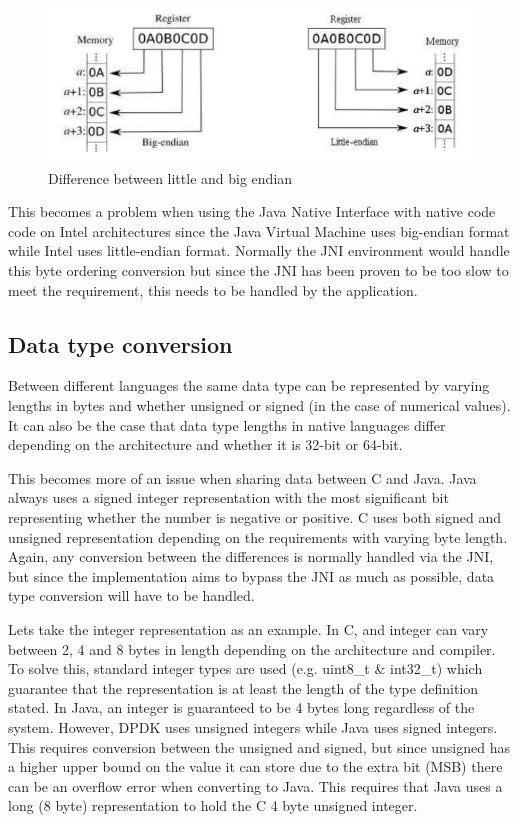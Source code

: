 \documentclass[final_report.tex]{subfiles}
\begin{document}
\begin{figure}[H]
	\centering
	\includegraphics[width=\textwidth]{img/endian.png}
	\caption{Difference between little and big endian}
	\label{fig:endian}
\end{figure}

This becomes a problem when using the Java Native Interface with native code code on Intel architectures since the Java Virtual Machine uses big-endian format while Intel uses little-endian format. Normally the JNI environment would handle this byte ordering conversion but since the JNI has been proven to be too slow  to meet the requirement, this needs to be handled by the application.

\subsection{Data type conversion}
Between different languages the same data type can be represented by varying lengths in bytes and whether unsigned or signed (in the case of numerical values). It can also be the case that data type lengths in native languages differ depending on the architecture and whether it is 32-bit or 64-bit.

This becomes more of an issue when sharing data between C and Java. Java always uses a signed integer representation with the most significant bit representing whether the number is negative or positive. C uses both signed and unsigned representation depending on the requirements with varying byte length. Again, any conversion between the differences is normally handled via the JNI, but since the implementation aims to bypass the JNI as much as possible, data type conversion will have to be handled.

Lets take the integer representation as an example. In C, and integer can vary between 2, 4 and 8 bytes in length depending on the architecture and compiler. To solve this, standard integer types are used (e.g. uint8\_t \& int32\_t) which guarantee that the representation is at least the length of the type definition stated. In Java, an integer is guaranteed to be 4 bytes long regardless of the system. However, DPDK uses unsigned integers while Java uses signed integers. This requires conversion between the unsigned and signed, but since unsigned has a higher upper bound on the value it can store due to the extra bit (MSB) there can be an overflow error when converting to Java. This requires that Java uses a long (8 byte) representation to hold the C 4 byte unsigned integer.
\end{document}
